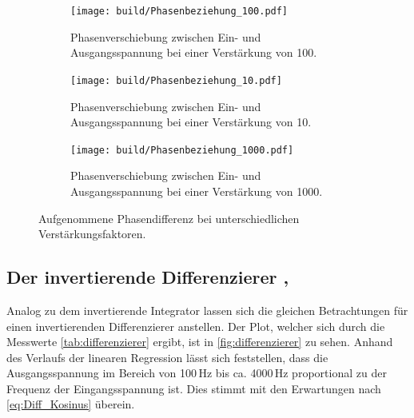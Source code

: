 \begin{figure}
    \centering
    \begin{subfigure}[b]{0.45\textwidth}
        \centering
        \texttt{[image: build/Phasenbeziehung\_100.pdf]}
        \caption{Phasenverschiebung zwischen Ein- und Ausgangsspannung bei einer Verstärkung von 100.}
        \label{fig:phase_100}
    \end{subfigure}
    \hfill
    \begin{subfigure}[b]{0.45\textwidth}
        \centering
        \texttt{[image: build/Phasenbeziehung\_10.pdf]}
        \caption{Phasenverschiebung zwischen Ein- und Ausgangsspannung bei einer Verstärkung von 10.}
        \label{fig:phase_10}
    \end{subfigure} 
    \newline
    \newline   
    \newline   
    \newline   
    \begin{subfigure}[b]{0.45\textwidth}
        \centering
        \texttt{[image: build/Phasenbeziehung\_1000.pdf]}
        \caption{Phasenverschiebung zwischen Ein- und Ausgangsspannung bei einer Verstärkung von 1000.}
        \label{fig:phase_1000}
    \end{subfigure}
       \caption{Aufgenommene Phasendifferenz bei unterschiedlichen Verstärkungsfaktoren.}
       \label{fig:phase}
\end{figure}
\FloatBarrier

\subsection{Der invertierende Differenzierer \cite{int_data}, \cite{int_picture}}
Analog zu dem invertierende Integrator lassen sich die gleichen Betrachtungen 
für einen invertierenden Differenzierer anstellen.
Der Plot, welcher sich durch die Messwerte \autoref{tab:differenzierer} ergibt, ist in
\autoref{fig:differenzierer} zu sehen.
Anhand des Verlaufs der linearen Regression lässt sich feststellen, dass die Ausgangsspannung
im Bereich von 100\,Hz bis ca. 4000\,Hz proportional zu der Frequenz der Eingangsspannung ist.
Dies stimmt mit den Erwartungen nach \autoref{eq:Diff_Kosinus} überein.


